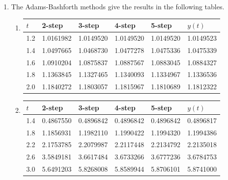 \begin{posttest}
\begin{mysolution}
\begin{enumerate}[label=\arabic*.]
\begin{multicols}{2}
\begin{enumerate}[label=(\alph*)]
\end{enumerate}
\end{multicols}

\item The Adams-Bashforth methods give the results in the following tables.\\
\begin{enumerate}[label=(\alph*)]
\item

\begin{center}
\begin{tabular}{|l|l|l|l|l|l|}
\hline
$t$ & 2-step & 3-step & 4-step & 5-step & $y(t)$ \\
\hline
1.2 & 1.0161982 & 1.0149520 & 1.0149520 & 1.0149520 & 1.0149523 \\
\hline
1.4 & 1.0497665 & 1.0468730 & 1.0477278 & 1.0475336 & 1.0475339 \\
\hline
1.6 & 1.0910204 & 1.0875837 & 1.0887567 & 1.0883045 & 1.0884327 \\
\hline
1.8 & 1.1363845 & 1.1327465 & 1.1340093 & 1.1334967 & 1.1336536 \\
\hline
2.0 & 1.1840272 & 1.1803057 & 1.1815967 & 1.1810689 & 1.1812322 \\
\hline
\end{tabular}
\end{center}

\item

\begin{center}
\begin{tabular}{|l|l|l|l|l|l|}
\hline
$t$ & 2-step & 3-step & 4-step & 5-step & $y(t)$ \\
\hline
1.4 & 0.4867550 & 0.4896842 & 0.4896842 & 0.4896842 & 0.4896817 \\
\hline
1.8 & 1.1856931 & 1.1982110 & 1.1990422 & 1.1994320 & 1.1994386 \\
\hline
2.2 & 2.1753785 & 2.2079987 & 2.2117448 & 2.2134792 & 2.2135018 \\
\hline
2.6 & 3.5849181 & 3.6617484 & 3.6733266 & 3.6777236 & 3.6784753 \\
\hline
3.0 & 5.6491203 & 5.8268008 & 5.8589944 & 5.8706101 & 5.8741000 \\
\hline
\end{tabular}
\end{center}


\end{enumerate}
\end{enumerate}
\end{mysolution}
\end{posttest}
